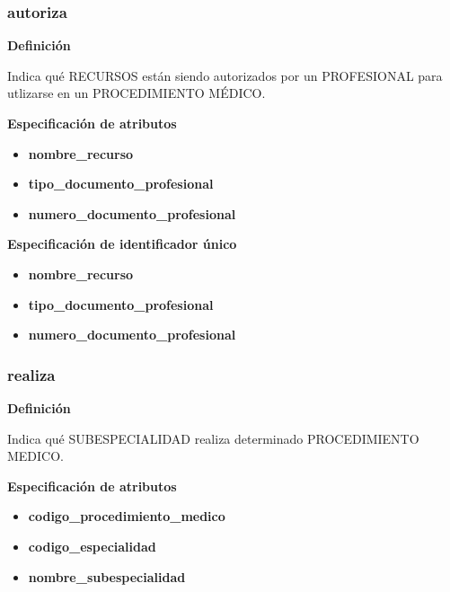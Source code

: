 \documentclass[a4paper,11pt]{article}
\begin{document}
\subsubsection{\textbf{autoriza}}

\textbf{Definición}

Indica qué RECURSOS están siendo autorizados por un PROFESIONAL para utlizarse en 
un PROCEDIMIENTO MÉDICO.

\textbf{Especificación de atributos}

\begin{itemize}

     \item \textbf{nombre\_recurso}

     \item \textbf{tipo\_documento\_profesional}

     \item \textbf{numero\_documento\_profesional}

\end{itemize}

\textbf{Especificación de identificador único}

\begin{itemize}

     \item \textbf{nombre\_recurso}

     \item \textbf{tipo\_documento\_profesional}

     \item \textbf{numero\_documento\_profesional}

\end{itemize}

\subsubsection{\textbf{realiza}}

\textbf{Definición}

Indica qué SUBESPECIALIDAD realiza determinado PROCEDIMIENTO MEDICO.

\textbf{Especificación de atributos}


\begin{itemize}
     \item \textbf{codigo\_procedimiento\_medico}

     \item \textbf{codigo\_especialidad}

     \item \textbf{nombre\_subespecialidad}


\end{itemize}
\end{document}
